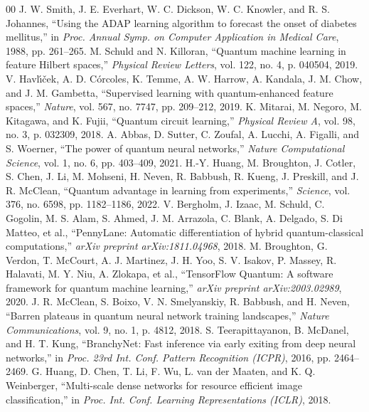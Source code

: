 \documentclass[conference]{IEEEtran}
\begin{document}
\begin{thebibliography}{00}
 J. W. Smith, J. E. Everhart, W. C. Dickson, W. C. Knowler, and R. S. Johannes, ``Using the ADAP learning algorithm to forecast the onset of diabetes mellitus,'' in \textit{Proc. Annual Symp. on Computer Application in Medical Care}, 1988, pp. 261--265.
 M. Schuld and N. Killoran, ``Quantum machine learning in feature Hilbert spaces,'' \textit{Physical Review Letters}, vol. 122, no. 4, p. 040504, 2019.
 V. Havl{\'\i}{\v{c}}ek, A. D. C{\'o}rcoles, K. Temme, A. W. Harrow, A. Kandala, J. M. Chow, and J. M. Gambetta, ``Supervised learning with quantum-enhanced feature spaces,'' \textit{Nature}, vol. 567, no. 7747, pp. 209--212, 2019.
 K. Mitarai, M. Negoro, M. Kitagawa, and K. Fujii, ``Quantum circuit learning,'' \textit{Physical Review A}, vol. 98, no. 3, p. 032309, 2018.
 A. Abbas, D. Sutter, C. Zoufal, A. Lucchi, A. Figalli, and S. Woerner, ``The power of quantum neural networks,'' \textit{Nature Computational Science}, vol. 1, no. 6, pp. 403--409, 2021.
 H.-Y. Huang, M. Broughton, J. Cotler, S. Chen, J. Li, M. Mohseni, H. Neven, R. Babbush, R. Kueng, J. Preskill, and J. R. McClean, ``Quantum advantage in learning from experiments,'' \textit{Science}, vol. 376, no. 6598, pp. 1182--1186, 2022.
 V. Bergholm, J. Izaac, M. Schuld, C. Gogolin, M. S. Alam, S. Ahmed, J. M. Arrazola, C. Blank, A. Delgado, S. Di Matteo, et al., ``PennyLane: Automatic differentiation of hybrid quantum-classical computations,'' \textit{arXiv preprint arXiv:1811.04968}, 2018.
 M. Broughton, G. Verdon, T. McCourt, A. J. Martinez, J. H. Yoo, S. V. Isakov, P. Massey, R. Halavati, M. Y. Niu, A. Zlokapa, et al., ``TensorFlow Quantum: A software framework for quantum machine learning,'' \textit{arXiv preprint arXiv:2003.02989}, 2020.
 J. R. McClean, S. Boixo, V. N. Smelyanskiy, R. Babbush, and H. Neven, ``Barren plateaus in quantum neural network training landscapes,'' \textit{Nature Communications}, vol. 9, no. 1, p. 4812, 2018.
 S. Teerapittayanon, B. McDanel, and H. T. Kung, ``BranchyNet: Fast inference via early exiting from deep neural networks,'' in \textit{Proc. 23rd Int. Conf. Pattern Recognition (ICPR)}, 2016, pp. 2464--2469.
 G. Huang, D. Chen, T. Li, F. Wu, L. van der Maaten, and K. Q. Weinberger, ``Multi-scale dense networks for resource efficient image classification,'' in \textit{Proc. Int. Conf. Learning Representations (ICLR)}, 2018.

\end{thebibliography}
\end{document}
